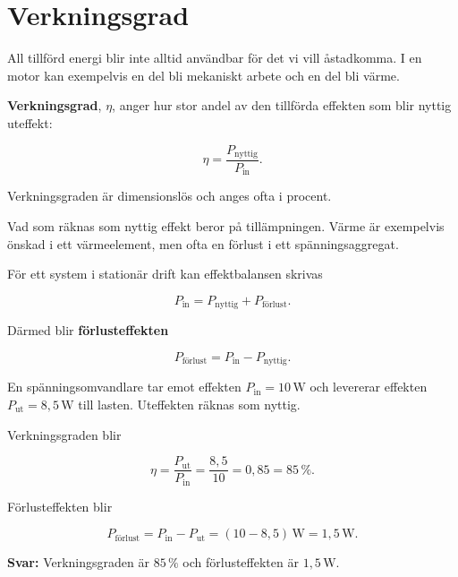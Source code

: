 \documentclass[
  swedish,
  11pt,
  a4paper,
  DIV=11,
  numbers=noendperiod,
  twoside,
  open=any]{scrreprt}
\begin{document}
\section{Verkningsgrad}\label{sec-effekt-verkningsgrad}

All tillförd energi blir inte alltid användbar för det vi vill
åstadkomma. I en motor kan exempelvis en del bli mekaniskt arbete och en
del bli värme.

\textbf{Verkningsgrad}, \(\eta\), anger hur stor andel av den tillförda
effekten som blir nyttig uteffekt:

\[
\boxed{\eta
= \frac{P_\mathrm{nyttig}}{P_\mathrm{in}}}.
\]

Verkningsgraden är dimensionslös och anges ofta i procent.

Vad som räknas som nyttig effekt beror på tillämpningen. Värme är
exempelvis önskad i ett värmeelement, men ofta en förlust i ett
spänningsaggregat.

För ett system i stationär drift kan effektbalansen skrivas

\[
P_\mathrm{in}
= P_\mathrm{nyttig}
+ P_\mathrm{förlust}.
\]

Därmed blir \textbf{förlusteffekten}

\[
\boxed{P_\mathrm{förlust}
= P_\mathrm{in} - P_\mathrm{nyttig}}.
\]

\begin{tcolorbox}[enhanced jigsaw, arc=.35mm, bottomrule=.15mm, bottomtitle=1mm, breakable, colback=white, colbacktitle=quarto-callout-note-color!10!white, colframe=quarto-callout-note-color-frame, coltitle=black, left=2mm, leftrule=.75mm, opacityback=0, opacitybacktitle=0.6, rightrule=.15mm, title={Exempel: verkningsgrad hos en spänningsomvandlare}, titlerule=0mm, toprule=.15mm, toptitle=1mm]

En spänningsomvandlare tar emot effekten
\(P_\mathrm{in} = 10\,\mathrm{W}\) och levererar effekten
\(P_\mathrm{ut} = 8{,}5\,\mathrm{W}\) till lasten. Uteffekten räknas som
nyttig.

Verkningsgraden blir

\[
\eta
= \frac{P_\mathrm{ut}}{P_\mathrm{in}}
= \frac{8{,}5}{10}
= 0{,}85
= 85\,\%.
\]

Förlusteffekten blir

\[
P_\mathrm{förlust}
= P_\mathrm{in} - P_\mathrm{ut}
= (10 - 8{,}5)\,\mathrm{W}
= 1{,}5\,\mathrm{W}.
\]

\textbf{Svar:} Verkningsgraden är \(85\,\%\) och förlusteffekten är
\(1{,}5\,\mathrm{W}\).

\end{tcolorbox}
\end{document}

